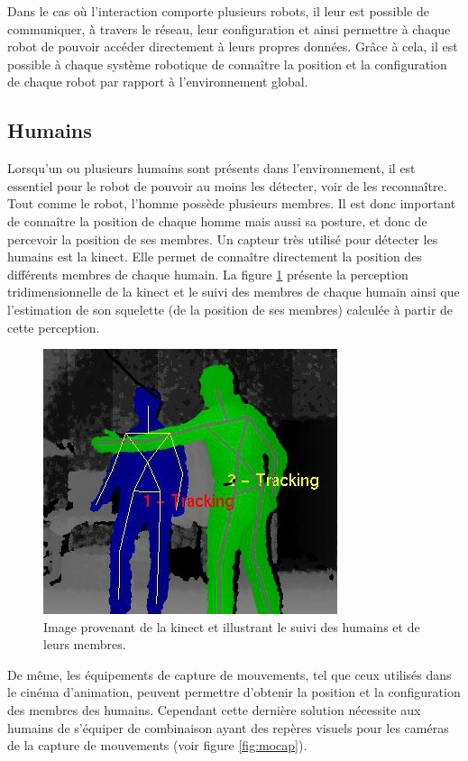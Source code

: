 \documentclass[a4paper,11pt,twoside]{StyleThese}
\begin{document}
Dans le cas où l'interaction comporte plusieurs robots, il leur est possible de communiquer, à travers le réseau, leur configuration et ainsi permettre à chaque robot de pouvoir accéder directement à leurs propres données. Grâce à cela, il est possible à chaque système robotique de connaître la position et la configuration de chaque robot par rapport à l'environnement global.


\subsection{Humains}

Lorsqu'un ou plusieurs humains sont présents dans l'environnement, il est essentiel pour le robot de pouvoir au moins les détecter, voir de les reconnaître.
Tout comme le robot, l'homme possède plusieurs membres. Il est donc important de connaître la position de chaque homme mais aussi sa posture, et donc de percevoir la position de ses membres. Un capteur très utilisé pour détecter les humains est la kinect. Elle permet de connaître directement la position des différents membres de chaque humain. La figure \ref{fig:skeleton} présente la perception tridimensionnelle de la kinect et le suivi des membres de chaque humain ainsi que l'estimation de son squelette (de la position de ses membres) calculée à partir de cette perception.

\begin{figure}[ht!]
 \centering
  \includegraphics[width=0.59\linewidth]{./img/skeleton3.jpg} 
  \caption {Image provenant de la kinect et illustrant le suivi des humains et de leurs membres.}
  \label{fig:skeleton}
\end{figure}


De même, les équipements de capture de mouvements, tel que ceux utilisés dans le cinéma d'animation, peuvent permettre d'obtenir la position et la configuration des membres des humains. Cependant cette dernière solution nécessite aux humains de s'équiper de combinaison ayant des repères visuels pour les caméras de la capture de mouvements (voir figure \ref{fig:mocap}).
\end{document}
